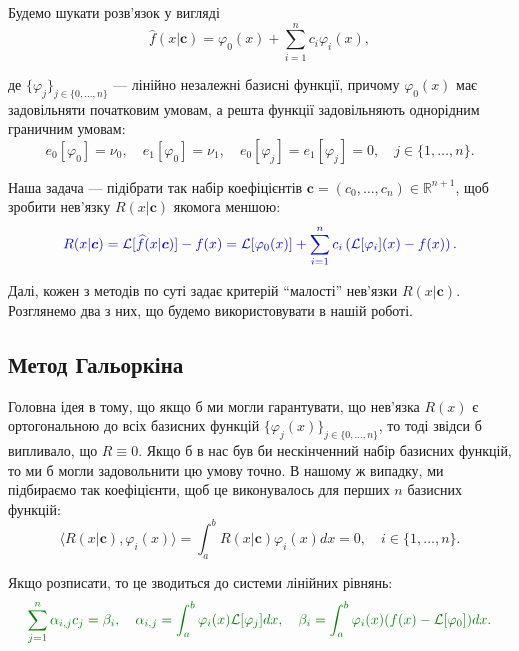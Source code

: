 \documentclass[14pt]{extarticle}
\begin{document}
Будемо шукати розв'язок у вигляді
\begin{equation*}
    \widehat{f}(x|\boldsymbol{c}) = \varphi_0(x) + \sum_{i=1}^n c_i\varphi_i(x),
\end{equation*}

де $\{\varphi_j\}_{j \in \{0,\dots,n\}}$ --- лінійно незалежні базисні 
функції, причому $\varphi_0(x)$ має задовільняти початковим умовам, а решта 
функції задовільняють однорідним граничним умовам:
\begin{equation*}
    e_0[\varphi_0] = \nu_0, \quad e_1[\varphi_0] = \nu_1, \quad e_0[\varphi_j] = e_1[\varphi_j] = 0, \quad j \in \{1,\dots,n\}.
\end{equation*}

Наша задача --- підібрати так набір коефіцієнтів $\boldsymbol{c} = (c_0,\dots,c_n) \in \mathbb{R}^{n+1}$,
щоб зробити нев'язку $R(x|\boldsymbol{c})$ якомога меншою:
\begin{equation*}
    \textcolor{blue}{R(x|\boldsymbol{c}) = \mathcal{L}[\widehat{f}(x|\boldsymbol{c})] - f(x) = \mathcal{L}[\varphi_0(x)] + \sum_{i=1}^n c_i\left(\mathcal{L}[\varphi_i](x) - f(x)\right).}
\end{equation*}

Далі, кожен з методів по суті задає критерій ``малості'' нев'язки $R(x|\boldsymbol{c})$. 
Розглянемо два з них, що будемо використовувати в нашій роботі.

\subsection{Метод Гальоркіна}

Головна ідея в тому, що якщо б ми могли гарантувати, що нев'язка $R(x)$ є
ортогональною до всіх базисних функцій $\{\varphi_j(x)\}_{j \in \{0,\dots,n\}}$,
то тоді звідси б випливало, що $R \equiv 0$. Якщо б в нас був би нескінченний 
набір базисних функцій, то ми б могли задовольнити цю умову точно. В нашому 
ж випадку, ми підбираємо так коефіцієнти, щоб це виконувалось для 
перших $n$ базисних функцій:
\begin{equation*}
    \langle R(x|\boldsymbol{c}), \varphi_i(x) \rangle = \int_a^b R(x|\boldsymbol{c})\varphi_i(x)dx = 0, \quad i \in \{1,\dots,n\}.
\end{equation*}

Якщо розписати, то це зводиться до системи лінійних рівнянь:
\begin{equation*}
    \textcolor{green!50!black}{\sum_{j=1}^n \alpha_{i,j}c_j = \beta_{i}, \quad \alpha_{i,j} = \int_a^b \varphi_i(x)\mathcal{L}[\varphi_j]dx, \quad \beta_i = \int_a^b \varphi_i(x)(f(x)-\mathcal{L}[\varphi_0])dx.}
\end{equation*}
\end{document}

